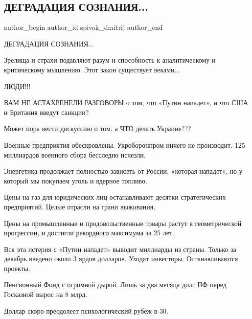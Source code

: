  
 
 
 
 
 
\subsection{ДЕГРАДАЦИЯ СОЗНАНИЯ...}
\label{sec:28_01_2022.fb.spivak_dmitrij.1.degradacia_soznania}
 
\ifcmt
 author_begin
   author_id spivak_dmitrij
 author_end
\fi

ДЕГРАДАЦИЯ СОЗНАНИЯ...

Зрелища и страхи подавляют разум и способность к аналитическому и критическому
мышлению. Этот закон существует веками... 

ЛЮДИ!!! 

ВАМ НЕ АСТАХРЕНЕЛИ РАЗГОВОРЫ о том, что «Путин нападет», и что США и Британия
введут санкции? 

Может пора вести дискуссию о том, а ЧТО делать Украине??? 

Военные предприятия обескровлены. Укроборонпром ничего не производит. 125
миллиардов военного сбора бесследно исчезли.

Энергетика продолжает полностью зависеть от России, «которая нападет», но у
который мы покупаем уголь и ядерное топливо. 

Цены на газ для юридических лиц останавливают десятки стратегических
предприятий. Целые отрасли на грани выживания. 

Цены на промышленные и продовольственные товары растут в геометрической
прогрессии, и достигли рекордного максимума за 25 лет. 

Вся эта истерия с «Путин нападет» выводит миллиарды из страны. Только за
декабрь введено около 3 ярдов долларов. Уходят инвесторы. Останавливаются
проекты. 

Пенсионный Фонд с огромной дырой. Лишь за два месяца долг ПФ перед Госказной
вырос на 8 млрд. 

Доллар скоро преодолеет психологический рубеж в 30. 

